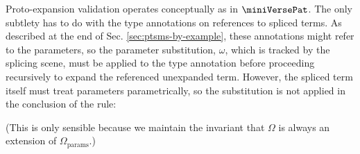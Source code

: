 \documentclass[acmlarge,review,anonymous]{acmart}\settopmatter{printfolios=true}
\begin{document}
Proto-expansion validation operates conceptually as in $\miniVersePat$. The only subtlety has to do with the type annotations on references to spliced terms. As described at the end of Sec. \ref{sec:ptsms-by-example}, these annotations might refer to the parameters, so the parameter substitution, $\omega$, which is tracked by the splicing scene, must be applied to the type annotation before proceeding recursively to expand the referenced unexpanded term. However, the spliced term itself must treat parameters parametrically, so the substitution is not applied in the conclusion of the rule:
\begin{mathpar}\label{rule:cvalidE-P-splicede}
\vspace{-5px}
\end{mathpar}
(This is only sensible because we maintain the invariant that $\Omega$ is always an extension of $\Omega_\text{params}$.)
\end{document}
